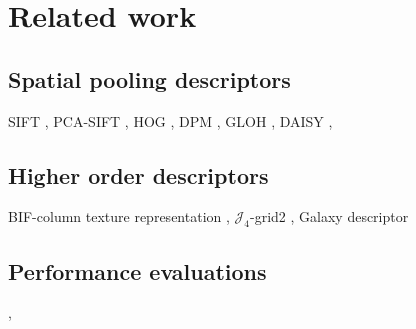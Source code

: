 \documentclass[../thesis.tex]{subfiles}
\begin{document}
\section{Related work}

\subsection{Spatial pooling descriptors}

SIFT \cite{lowe2004distinctive},
PCA-SIFT \cite{ke2004pca},
HOG \cite{dalal2005histograms},
DPM \cite{felzenszwalb2008discriminatively},
GLOH \cite{mikolajczyk2005performance},
DAISY \cite{tola2008fast,winder2009picking},

\subsection{Higher order descriptors}

BIF-column texture representation \cite{crosier2010using},
$\mathcal{J}_4$-grid2 \cite{larsen2012jet},
Galaxy descriptor \cite{pedersen2013shape}

\subsection{Performance evaluations}

\cite{mikolajczyk2005performance},
\cite{dahl2011finding}

\subbibliography
\end{document}
